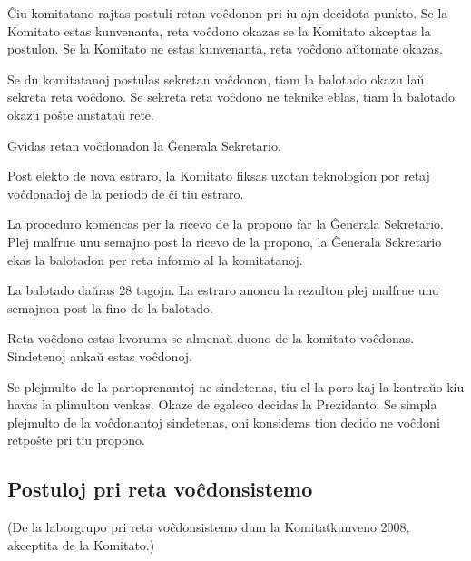 \documentclass[draft]{scrartcl}
\newenvironment{enumerate*}{%
  \begin{enumerate}%
  \setlength{\itemsep}{0pt}%
  \setlength{\parsep}{0pt}%
  \setlength{\parskip}{2pt plus 1pt}
  \setlength{\topsep}{1pt}%
  \setlength{\partopsep}{0pt}%
}{%
    \end{enumerate}%
}
\begin{document}
\begin{enumerate*}

\item Ĉiu komitatano rajtas postuli retan voĉdonon pri iu ajn decidota
punkto. Se la Komitato estas kunvenanta, reta voĉdono okazas se la
Komitato akceptas la postulon. Se la Komitato ne estas kunvenanta,
reta voĉdono aŭtomate okazas.

\item Se du komitatanoj postulas sekretan voĉdonon, tiam la balotado
okazu laŭ sekreta reta voĉdono. Se sekreta reta voĉdono ne teknike
eblas, tiam la balotado okazu poŝte anstataŭ rete.

\item Gvidas retan voĉdonadon la Ĝenerala Sekretario.

\item Post elekto de nova estraro, la Komitato fiksas uzotan teknologion
por retaj voĉdon\-adoj de la periodo de ĉi tiu estraro.

\item La proceduro komencas per la ricevo de la propono far la Ĝenerala
Sekretario. Plej malfrue unu semajno post la ricevo de la propono, la
Ĝenerala Sekretario ekas la balotadon per reta informo al la
komitatanoj.

\item La balotado daŭras 28 tagojn. La estraro anoncu la rezulton plej
malfrue unu semajnon post la fino de la balotado.

\item Reta voĉdono estas kvoruma se almenaŭ duono de la komitato
voĉdonas. Sindetenoj ankaŭ estas voĉdonoj.

\item Se plejmulto de la partoprenantoj ne sindetenas, tiu el la poro kaj
la kontraŭo kiu havas la plimulton venkas. Okaze de egaleco decidas la
Prezidanto. Se simpla plejmulto de la voĉdonantoj sindetenas, oni
konsideras tion decido ne voĉdoni retpoŝte pri tiu propono.
\end{enumerate*}

\subsection{Postuloj pri reta voĉdonsistemo} \label{postuloj}

(De la laborgrupo pri reta voĉdonsistemo dum la Komitatkunveno 2008,
akceptita de la Komitato.)
\end{document}
